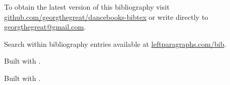 \documentclass[10pt,a4paper]{article}
\begin{document}
To obtain the latest version of this bibliography visit \href{http://github.com/georgthegreat/dancebooks-bibtex}{github.com/georgthegreat/dancebooks-bibtex} or write directly to \href{mailto://georgthegreat@gmail.com}{georgthegreat@gmail.com}.

Search within bibliography entries available at \href{http://leftparagraphs.com/bib/index.html}{leftparagraphs.com/bib}.

\ifluatex

Built with .

\else\ifpdf

Built with .

\fi\fi

\nocite{*}
\printbibliography
\end{document}
